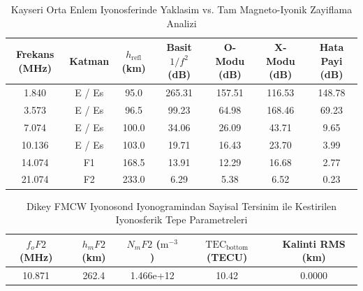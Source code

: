 \begin{table}[htbp]
\centering
\caption{Kayseri Orta Enlem Iyonosferinde Yaklasim vs. Tam Magneto-Iyonik Zayiflama Analizi}
\begin{tabular}{ccccccc}
\hline
\textbf{Frekans (MHz)} & \textbf{Katman} & \textbf{$h_{\mathrm{refl}}$ (km)} & \textbf{Basit $1/f^2$ (dB)} & \textbf{O-Modu (dB)} & \textbf{X-Modu (dB)} & \textbf{Hata Payi (dB)} \\
\hline
1.840 & E / Es & 95.0 & 265.31 & 157.51 & 116.53 & 148.78 \\
3.573 & E / Es & 96.5 & 99.23 & 64.98 & 168.46 & 69.23 \\
7.074 & E / Es & 100.0 & 34.06 & 26.09 & 43.71 & 9.65 \\
10.136 & E / Es & 103.0 & 19.71 & 16.43 & 23.70 & 3.99 \\
14.074 & F1 & 168.5 & 13.91 & 12.29 & 16.68 & 2.77 \\
21.074 & F2 & 233.0 & 6.29 & 5.38 & 6.52 & 0.23 \\
\hline
\end{tabular}
\end{table}

\begin{table}[htbp]
\centering
\caption{Dikey FMCW Iyonosond Iyonogramindan Sayisal Tersinim ile Kestirilen Iyonosferik Tepe Parametreleri}
\begin{tabular}{ccccc}
\hline
\textbf{$f_oF2$ (MHz)} & \textbf{$h_mF2$ (km)} & \textbf{$N_mF2$ ($\mathrm{m}^{-3}$)} & \textbf{$\mathrm{TEC}_{\mathrm{bottom}}$ (TECU)} & \textbf{Kalinti RMS (km)} \\
\hline
10.871 & 262.4 & 1.466e+12 & 10.42 & 0.0000 \\
\hline
\end{tabular}
\end{table}
